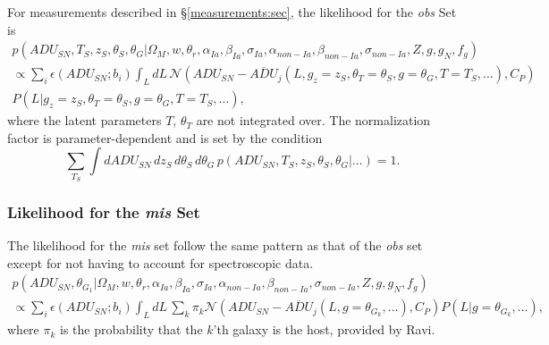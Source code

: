 \documentclass[preprint,3p]{elsarticle}
\begin{document}
For measurements described in \S\ref{measurements:sec}, the likelihood for the {\it obs} Set is
\begin{multline}
p(\mathit{ADU}_{SN}, {{T}}_S,{{z}}_S, \theta_{S}, \theta_G |  \Omega_M, w, \theta_r, \alpha_{Ia}, \beta_{Ia},\sigma_{Ia}, \alpha_{\mathit{non-Ia}},\beta_{\mathit{non-Ia}}, \sigma_{\mathit{non-Ia}},  Z, g, g_N, f_g)\\
\propto \sum_i  \epsilon(\mathit{ADU}_{SN}; b_{i})  \int_L dL\, 
\mathcal{N}\left(\mathit{ADU}_{SN} - \overline{\mathit{ADU}}_j(L ,
g_z=z_S, \theta_T=\theta_S, g=\theta_G, T=T_S, \ldots), C_P \right)\\
P(L|g_z=z_S, \theta_T=\theta_S, g=\theta_G, T=T_S, \ldots),
\end{multline} 
where the latent parameters $T$, $\theta_T$ are not integrated over.
The normalization factor is parameter-dependent and is set by the condition
\begin{equation}
\sum_{T_S} \int d\mathit{ADU}_{SN}\,d{{z}}_S\,d\theta_{S}\,d\theta_G\,p(\mathit{ADU}_{SN}, {{T}}_S,{{z}}_S, \theta_{S}, \theta_G |  \ldots)=1.
\end{equation}  

\subsubsection{Likelihood for the {\it mis} Set}
The likelihood for the {\it mis} set follow the same pattern as that of the
{\it obs} set except for not having to account for spectroscopic data.
\begin{multline}
p(\mathit{ADU}_{SN}, \theta_{G_1} |  \Omega_M, w, \theta_r, \alpha_{Ia}, \beta_{Ia},\sigma_{Ia}, \alpha_{\mathit{non-Ia}},\beta_{\mathit{non-Ia}}, \sigma_{\mathit{non-Ia}},  Z, g, g_N, f_g) \\
 \propto \sum_i  \epsilon(\mathit{ADU}_{SN}; b_{i}) 
\int_L dL\, 
\sum_k 
\pi_k\mathcal{N}\left(\mathit{ADU}_{SN} - \overline{\mathit{ADU}}_j(L ,
g=\theta_{G_k}, \ldots), C_P \right)
P(L|g=\theta_{G_k}, \ldots), 
\end{multline} 
where $\pi_k$ is the probability that the $k$'th galaxy is the host, provided by Ravi.

\end{document}
